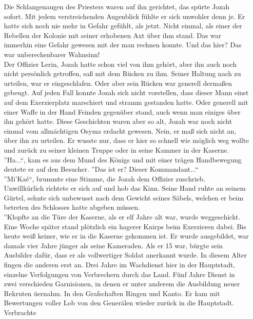 Die Schlangenaugen des Priesters waren auf ihn gerichtet, das spürte Jozah sofort. Mit jedem 
verstreichenden Augenblick fühlte er sich unwohler denn je. Er hatte sich noch nie mehr in Gefahr 
gefühlt, als jetzt. Nicht einmal, als einer der Rebellen der Kolonie mit seiner erhobenen Axt über 
ihm stand. Das war immerhin eine Gefahr gewesen mit der man rechnen konnte. Und das hier? Das war 
unberechenbarer Wahnsinn!\\
Der Offizier Lerin, Jozah hatte schon viel von ihm gehört, aber ihn auch noch nicht persönlich 
getroffen, saß mit dem Rücken zu ihm. Seiner Haltung nach zu urteilen, war er eingeschlafen. Oder 
aber sein Rücken war generell dermaßen gebeugt. Auf jeden Fall konnte Jozah sich nicht vorstellen, 
dass dieser Mann einst auf dem Exerzierplatz marschiert und stramm gestanden hatte. Oder generell 
mit einer Waffe in der Hand Feinden gegenüber stand, auch wenn man einiges über ihn gehört 
hatte. Diese Geschichten waren aber so alt, Jozah war noch nicht einmal vom allmächtigen Osyma 
erdacht gewesen. Nein, er maß sich nicht an, über ihn zu urteilen. Er wusste nur, dass er hier so 
schnell wie möglich weg wollte und zurück zu seiner kleinen Truppe oder in seine Kammer in der 
Kaserne.\\
''Ha...``, kam es aus dem Mund des Königs und mit einer trägen Handbewegung deutete er auf den 
Besucher. ''Das ist er? Dieser Kommandant...``\\
''Mi'Kaé``, brummte eine Stimme, die Jozah dem Offizier zuschrieb. \\
Unwillkürlich richtete er sich auf und hob das Kinn. Seine Hand ruhte an seinem Gürtel, sehnte sich 
unbewusst nach dem Gewicht seines Säbels, welchen er beim betreten des Schlosses hatte abgeben 
müssen.\\
''Klopfte an die Türe der Kaserne, als er elf Jahre alt war, wurde weggeschickt. Eine Woche später 
stand plötzlich ein hagerer Knirps beim Exerzieren dabei. Bis heute weiß keiner, wie er in die 
Kaserne gekommen ist. Er wurde ausgebildet, war damals vier Jahre jünger als seine Kameraden. Als 
er 15 war, bürgte sein Ausbilder dafür, dass er als vollwertiger Soldat anerkannt wurde. In diesem 
Alter fingen die anderen erst an. Drei Jahre im Wachdienst hier in der Hauptstadt, einzelne 
Verfolgungen von Verbrechern durch das Land. Fünf Jahre Dienst in zwei verschieden Garnisionen, in 
denen er unter anderem die Ausbildung neuer Rekruten üernahm. In den Grafschaften Ringen und Kanto. 
Er kam mit Bewertungen voller Lob von den Generälen wieder zurück in die Hauptstadt. Verbrachte 
